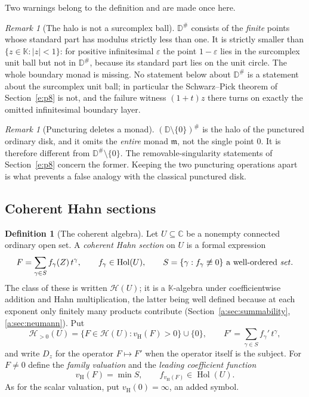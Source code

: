 \documentclass[11pt,a4paper]{article}
\numberwithin{equation}{section}
\theoremstyle{definition}
\newtheorem{definition}[theorem]{Definition}
\theoremstyle{remark}
\newtheorem{remark}[theorem]{Remark}
\theoremstyle{plain}
\newcommand{\K}{\mathbb K}
\newcommand{\CC}{\mathbb C}
\newcommand{\mm}{\mathfrak m}
\DeclareMathOperator{\Hol}{Hol}
\newcommand{\tm}{t}
\newcommand{\halo}[1]{#1^{\#}}
\newcommand{\Hc}{\mathcal H}
\newcommand{\vH}{v_{\mathrm H}}
\newcommand{\abs}[1]{\lvert #1\rvert}
\begin{document}
Two warnings belong to the definition and are made once here.

\begin{remark}[The halo is not a surcomplex ball]\label{c:p4:rk-notball}
$\halo{\mathbb D}$ consists of the \emph{finite} points whose standard
part has modulus strictly less than one. It is strictly smaller than
$\{z\in\K:\abs z<1\}$: for positive infinitesimal $\varepsilon$ the
point $1-\varepsilon$ lies in the surcomplex unit ball but not in
$\halo{\mathbb D}$, because its standard part lies on the unit circle.
The whole boundary monad is missing. No statement below about
$\halo{\mathbb D}$ is a statement about the surcomplex unit ball; in
particular the Schwarz--Pick theorem of Section~\ref{e:p8} is not, and
the failure witness $(1+\tm)z$ there turns on exactly the omitted
infinitesimal boundary layer.
\end{remark}

\begin{remark}[Puncturing deletes a monad]\label{c:p4:rk-punctured}
$\halo{(\mathbb D\setminus\{0\})}$ is the halo of the punctured ordinary
disk, and it omits the \emph{entire} monad $\mm$, not the single point
$0$. It is therefore different from $\halo{\mathbb D}\setminus\{0\}$.
The removable-singularity statements of Section~\ref{e:p8} concern the
former. Keeping the two puncturing operations apart is what prevents a
false analogy with the classical punctured disk.
\end{remark}

\subsection{Coherent Hahn sections}
\label{c:p4:def}

\begin{definition}[The coherent algebra]\label{c:p4:def-HU}
Let $U\subseteq\CC$ be a nonempty connected ordinary open set. A
\emph{coherent Hahn section} on $U$ is a formal expression
\begin{equation}\label{c:p4:eq-HU}
 F=\sum_{\gamma\in S}f_\gamma(Z)\,\tm^\gamma,
 \qquad f_\gamma\in\Hol(U),
 \qquad S=\{\gamma:f_\gamma\not\equiv0\}
 \ \text{a well-ordered \emph{set}}.
\end{equation}
The class of these is written $\Hc(U)$; it is a $\K$-algebra under
coefficientwise addition and Hahn multiplication, the latter being
well defined because at each exponent only finitely many products
contribute (Section~\ref{a:sec:summability}, \ref{a:sec:neumann}). Put
\[
 \Hc_{>0}(U)=\{F\in\Hc(U): \vH(F)>0\}\cup\{0\},
 \qquad
 F'=\sum_{\gamma\in S}f_\gamma'\,\tm^\gamma,
\]
and write $D_z$ for the operator $F\mapsto F'$ when the operator itself
is the subject. For $F\ne0$ define the \emph{family valuation} and the
\emph{leading coefficient function}
\[
 \vH(F)=\min S,\qquad f_{\vH(F)}\in\Hol(U).
\]
As for the scalar valuation, put $\vH(0)=\infty$, an added symbol.
\end{definition}
\end{document}
